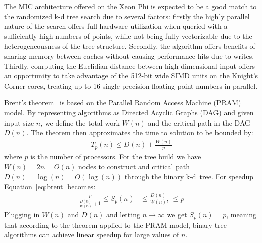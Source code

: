    The MIC architecture offered on the Xeon Phi is expected to be a good match to the randomized k-d tree search 
  due to several factors: firstly the highly parallel nature of the search 
  offers full hardware utilization when queried with a sufficiently high 
  numbers of points, while not being fully vectorizable due to the 
  heterogeneousness of the tree structure.
  Secondly, the algorithm offers benefits of sharing memory between caches 
  without causing performance hits due to writes. Thirdly, computing the 
  Euclidian distance between high dimensional input offers an opportunity to 
  take advantage of the 512-bit wide SIMD units on the Knight's Corner cores, 
  treating up to 16 single precision floating point numbers in parallel.  

   Brent's theorem~\cite{brent} is based on the Parallel Random Access Machine (PRAM) model. By representing algorithms as Directed Acyclic Graphs (DAG) and given input size $n$, we define the total work $W(n)$ and the critical path in the DAG $D(n)$. The theorem then approximates the time to solution to be bounded by:
  \begin{align}
    T_p(n) \leq D(n) + \frac{W(n)}{p}
    \label{eq:brent}
  \end{align}
  where $p$ is the number of processors. For the tree build we have $W(n)=2n=O(n)$ nodes to construct and critical path $D(n)=\operatorname{log}(n)=O(\operatorname{log}(n))$ through the binary k-d~tree.
  For speedup Equation~\ref{eq:brent} becomes:
  \begin{align}
    \frac{p}{\frac{D(n)}{W(n)} + 1} \leq S_p(n) &\leq \frac{D(n)}{W(n)}\text{, }\leq p
  \end{align}
  Plugging in $W(n)$ and $D(n)$ and letting $n\rightarrow\infty$ we get $S_p(n)=p$, meaning that according to the theorem applied to the PRAM model, binary tree algorithms can achieve linear speedup for large values of $n$.  %
%
%

